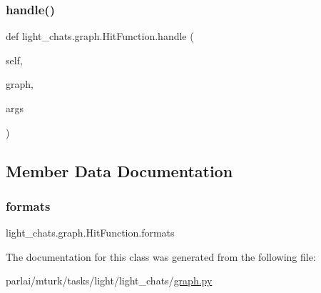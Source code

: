 \mbox{\label{classlight__chats_1_1graph_1_1HitFunction_afcc616271cdc3acede3dcabdfe516598}} 
\subsubsection{\texorpdfstring{handle()}{handle()}}
{\footnotesize\ttfamily def light\+\_\+chats.\+graph.\+Hit\+Function.\+handle (\begin{DoxyParamCaption}\item[{}]{self,  }\item[{}]{graph,  }\item[{}]{args }\end{DoxyParamCaption})}



\subsection{Member Data Documentation}
\mbox{\label{classlight__chats_1_1graph_1_1HitFunction_a52f8cfade8a8bd90e48e125bc2232e44}} 
\subsubsection{\texorpdfstring{formats}{formats}}
{\footnotesize\ttfamily light\+\_\+chats.\+graph.\+Hit\+Function.\+formats}



The documentation for this class was generated from the following file\+:\begin{DoxyCompactItemize}
\item 
parlai/mturk/tasks/light/light\+\_\+chats/\hyperlink{parlai_2mturk_2tasks_2light_2light__chats_2graph_8py}{graph.\+py}\end{DoxyCompactItemize}
